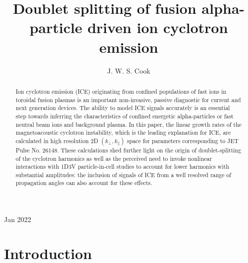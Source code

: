 \documentclass[12pt]{iopart}
\begin{document}
\title[]{Doublet splitting of fusion alpha-particle driven ion cyclotron emission}

\author{J. W. S. Cook}

\address{UKAEA-CCFE, Culham Science Centre, Abingdon, OX14 3DB, UK}
\vspace{10pt}
\begin{indented}
\item[]Jan 2022
\end{indented}

\begin{abstract}
Ion cyclotron emission (ICE) originating from confined populations of fast ions
  in toroidal fusion plasmas is an important non-invasive, passive diagnostic
  for current and next generation devices. The ability to model ICE signals
  accurately is an essential step towards inferring the characteristics of
  confined energetic alpha-particles or fast neutral beam ions and background plasma.
  In this paper, the linear growth rates of the magnetoacoustic cyclotron
  instability, which is the leading explanation for ICE, are calculated in high
  resolution 2D $(k_\perp, k_\parallel)$ space for parameters corresponding to
  JET Pulse No. 26148. These calculations shed further light on the origin of
  doublet-splitting of the cyclotron harmonics as well as the perceived need to
  invoke nonlinear interactions with 1D3V particle-in-cell studies to account
  for lower harmonics with substantial amplitudes: the inclusion of signals of
  ICE from a well resolved range of propagation angles can also account for
  these effects.
\end{abstract}

%
%
%
% 
%


\section{Introduction}
\end{document}
